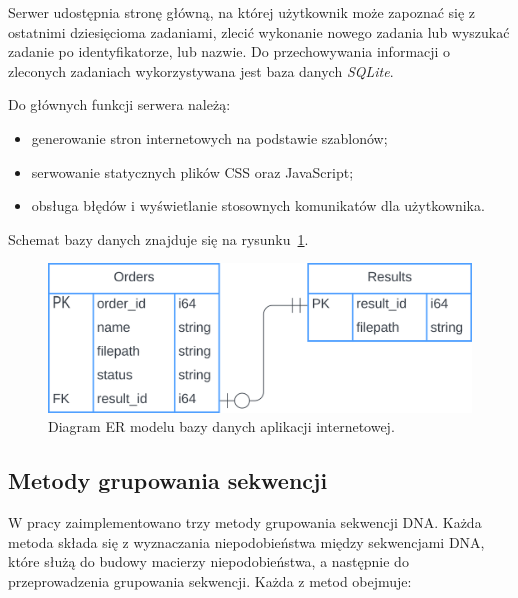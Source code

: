             Serwer udostępnia stronę główną, na której użytkownik może zapoznać się z ostatnimi dziesięcioma zadaniami, zlecić wykonanie nowego zadania lub wyszukać zadanie po identyfikatorze, lub nazwie. Do przechowywania informacji o zleconych zadaniach wykorzystywana jest baza danych \textit{SQLite}.
            
            Do głównych funkcji serwera należą:
            \begin{itemize}
                \item generowanie stron internetowych na podstawie szablonów;
                \item serwowanie statycznych plików CSS oraz JavaScript;
                \item obsługa błędów i wyświetlanie stosownych komunikatów dla użytkownika.
            \end{itemize}
            
            Schemat bazy danych znajduje się na rysunku~\ref{Picture:App:Database}.

            \begin{figure}[!htb]
                \begin{center}
                    \includegraphics[width=\textwidth]{tex/pictures/app/database.png}
                \end{center}
                \caption{
                    Diagram ER modelu bazy danych aplikacji internetowej.
                }\label{Picture:App:Database}
            \end{figure}

    \subsection{Metody grupowania sekwencji}

        W pracy zaimplementowano trzy metody grupowania sekwencji DNA. Każda metoda składa się z wyznaczania niepodobieństwa między sekwencjami DNA, które służą do budowy macierzy niepodobieństwa, a następnie do przeprowadzenia grupowania sekwencji. Każda z metod obejmuje:

